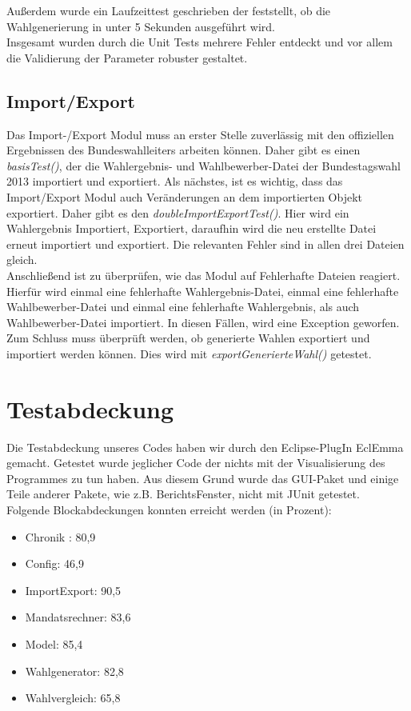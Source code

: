 \documentclass[12pt,a4paper,titlepage]{article}
\newcommand{\mymo}{\fontfamily{pcr}\selectfont \textit}
\begin{document}
Außerdem wurde ein Laufzeittest geschrieben der feststellt, ob die Wahlgenerierung in unter 5 Sekunden ausgeführt wird.\\

Insgesamt wurden durch die Unit Tests mehrere Fehler entdeckt und vor allem die Validierung der Parameter robuster gestaltet.

\subsection{Import/Export}
Das Import-/Export Modul muss an erster Stelle zuverlässig mit den offiziellen Ergebnissen des Bundeswahlleiters arbeiten können. Daher gibt es einen {\mymo{basisTest()}}, der die Wahlergebnis- und Wahlbewerber-Datei der Bundestagswahl 2013 importiert und exportiert.
Als nächstes, ist es wichtig, dass das Import/Export Modul auch Veränderungen an dem importierten Objekt exportiert. Daher gibt es den {\mymo{doubleImportExportTest()}}. Hier wird ein Wahlergebnis Importiert, Exportiert, daraufhin wird die neu erstellte Datei erneut importiert und exportiert. Die relevanten Fehler sind in allen drei Dateien gleich. \\

Anschließend ist zu überprüfen, wie das Modul auf Fehlerhafte Dateien reagiert. Hierfür wird einmal eine fehlerhafte Wahlergebnis-Datei, einmal eine fehlerhafte Wahlbewerber-Datei und einmal eine fehlerhafte Wahlergebnis, als auch Wahlbewerber-Datei importiert. In diesen Fällen, wird eine Exception geworfen. \\

Zum Schluss muss überprüft werden, ob generierte Wahlen exportiert und importiert werden können. Dies wird mit {\mymo{exportGenerierteWahl()}} getestet.

\section{Testabdeckung}
Die Testabdeckung unseres Codes haben wir durch den Eclipse-PlugIn EclEmma gemacht. Getestet wurde jeglicher Code der nichts mit der Visualisierung des Programmes zu tun haben. Aus diesem Grund wurde das GUI-Paket und einige Teile anderer Pakete, wie z.B. BerichtsFenster, nicht mit JUnit getestet.\\
Folgende Blockabdeckungen konnten erreicht werden (in Prozent):\\
\begin{itemize}
\item{Chronik} : 80,9 

\item{Config}: 46,9 

\item{ImportExport}: 90,5 

\item{Mandatsrechner}: 83,6 

\item{Model}: 85,4 

\item{Wahlgenerator}: 82,8 

\item{Wahlvergleich}: 65,8 

\end{itemize}
\end{document}
